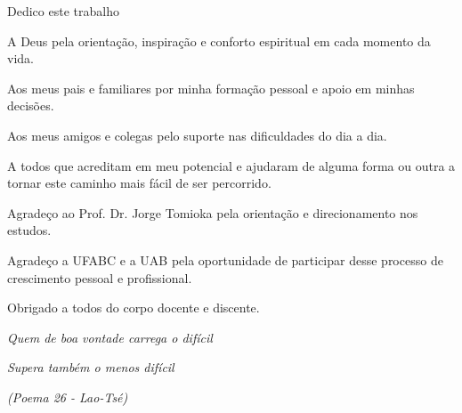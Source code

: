 \documentclass[
    12pt,               %
    openright,          %
    oneside,            %
    a4paper,            %
    chapter=TITLE,      %
    sumario=tradicional,
    english,            %
    french,             %
    spanish,            %
    brazil              %
]{abntex2}
\renewcommand{\imprimircapa}{
    \begin{capa}
        
    \end{capa}
}
\begin{document}
\frenchspacing %

\pretextual
\imprimircapa

\imprimirfolhaderosto

%

\begin{dedicatoria}
    \vspace*{1 cm}
    Dedico este trabalho
    \newline

    A Deus pela orientação, inspiração e conforto espiritual em cada momento da
    vida.
    \newline

    Aos meus pais e familiares por minha formação pessoal e apoio em minhas
    decisões.
    \newline

    Aos meus amigos e colegas pelo suporte nas dificuldades do dia a dia.
    \newline

    A todos que acreditam em meu potencial e ajudaram de alguma forma ou outra
    a tornar este caminho mais fácil de ser percorrido.

    \vspace*{\fill}
\end{dedicatoria}

\begin{agradecimentos}
    \vspace*{1 cm}
    Agradeço ao Prof. Dr. Jorge Tomioka pela orientação e direcionamento nos
    estudos.
    \newline

    Agradeço a UFABC e a UAB pela oportunidade de participar desse processo de
    crescimento pessoal e profissional.

    Obrigado a todos do corpo docente e discente.
    \vspace*{\fill}
\end{agradecimentos}

\begin{epigrafe}
    \vspace*{\fill}
    \begin{flushright}
        \textit{Quem de boa vontade carrega o difícil}

        \textit{Supera também o menos difícil}

        \textit{(Poema 26 - Lao-Tsé)}
    \end{flushright}
\end{epigrafe}
\end{document}
